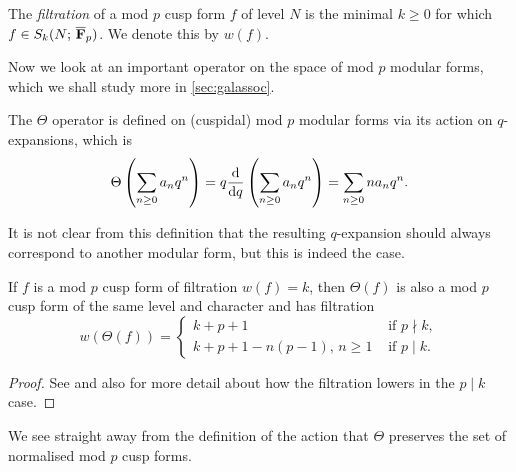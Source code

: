 \documentclass[a4paper,12pt]{article}
\begin{document}
\begin{defn}\label{def:filtration}
The \emph{filtration} of a mod $p$ cusp form $f$ of level $N$ is the minimal $k\ge 0$ for which $f\in S_k(N;\,\overline{\mathbf{F}}_p)$.
We denote this by $w(f)$.
\end{defn}

Now we look at an important operator on the space of mod $p$ modular forms, which we shall study more in \cref{sec:galassoc}.

\begin{defn}\label{def:theta}
The $\Theta$ operator is defined on (cuspidal) mod $p$ modular forms via its action on $q$-expansions, which is
\[
\Theta\left(\sum_{n\ge 0} a_nq^n\right) = q\frac{\mathrm{d}}{\mathrm{d}q} \left(\sum_{n\ge 0} a_nq^n\right) = \sum_{n\ge 0} na_nq^n.
\]
\end{defn}

It is not clear from this definition that the resulting $q$-expansion should  always correspond to another modular form, but this is indeed the case.

\begin{prop}\label{prop:thetafilt}
If $f$ is a mod $p$ cusp form of filtration $w(f) = k$, then $\Theta(f)$ is also a mod $p$ cusp form of the same level and character and has filtration
\[
w(\Theta(f)) = \begin{cases}
k + p + 1 &\text{ if } p\nmid k,\\
k + p + 1 - n(p-1),\, n\ge 1&\text{ if } p\mid k.
\end{cases}
\]
\end{prop}
\begin{proof}
See \cite{Serre73} and also \cite{Jochnowitz} for more detail about how the filtration lowers in the $p\mid k$ case.
\end{proof}

We see straight away from the definition of the action that $\Theta$ preserves the set of normalised mod $p$ cusp forms.
\end{document}
